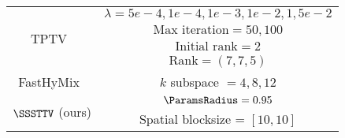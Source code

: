 \begin{table}[!t]
\begin{center}
\begin{tabular}{cc}
				\multirow{4}{*}{TPTV~\cite{Chen2023TPTV}} 
				& $\lambda = 5e-4, 1e-4, 1e-3, 1e-2, 1, 5e-2$ \\
				& $\text{Max iteration} = 50, 100$ \\
				& $\text{Initial rank} = 2$ \\
				& $\text{Rank} = (7, 7, 5)$
				\vspace{1mm} \\
				
				FastHyMix~\cite{Zhuang2023FastHyMix} 
				& $k$ subspace $= 4, 8, 12$
				\vspace{1mm} \\
				 
				
				\multirow{2}{*}{$\SSSTTV$ (ours)} & $\ParamsRadius = 0.95$ \\
				& Spatial blocksize = $[10, 10]$ \\
				
				
				\bottomrule
			\end{tabular}
	\end{center}
	\vspace{-3mm}
\end{table}